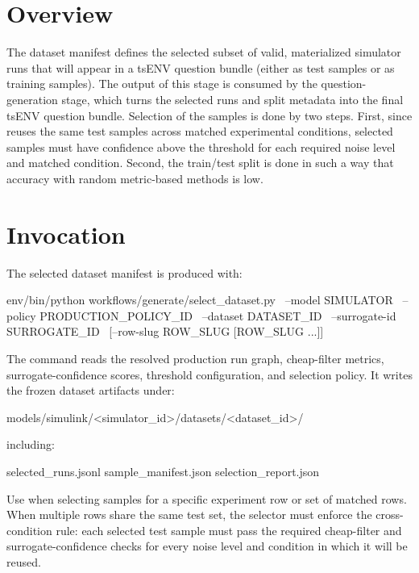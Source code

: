 \documentclass[11pt]{article}
\begin{document}
\label{docstart:dataset_manifest_schema}

\section*{Overview}
The dataset manifest defines the selected subset of valid, materialized simulator runs that will appear in a tsENV question bundle (either as test samples or as training samples).
The output of this stage is consumed by the question-generation stage, which turns the selected runs and split metadata into the final tsENV question bundle.
Selection of the samples is done by two steps.
First, since \name{} reuses the same test samples across matched experimental conditions, selected samples must have confidence above the threshold for each required noise level and matched condition.
Second, the train/test split is done in such a way that accuracy with random metric-based methods is low.

\section*{Invocation}

The selected dataset manifest is produced with:

\begin{DocCode}
env/bin/python workflows/generate/select_dataset.py \
  --model SIMULATOR \
  --policy PRODUCTION_POLICY_ID \
  --dataset DATASET_ID \
  --surrogate-id SURROGATE_ID \
  [--row-slug ROW_SLUG [ROW_SLUG ...]]
\end{DocCode}

The command reads the resolved production run graph, cheap-filter metrics, surrogate-confidence scores, threshold configuration, and selection policy.
It writes the frozen dataset artifacts under:

\begin{DocCode}
models/simulink/<simulator_id>/datasets/<dataset_id>/
\end{DocCode}

including:

\begin{DocCode}
selected_runs.jsonl
sample_manifest.json
selection_report.json
\end{DocCode}

Use  when selecting samples for a specific experiment row or set of matched rows.
When multiple rows share the same test set, the selector must enforce the cross-condition rule: each selected test sample must pass the required cheap-filter and surrogate-confidence checks for every noise level and condition in which it will be reused.
\end{document}

